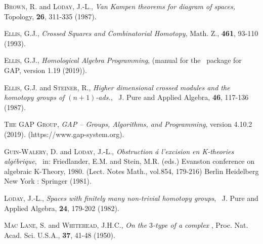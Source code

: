 \documentclass[a4paper,11pt]{article}
\theoremstyle{plain}
\theoremstyle{definition}
\begin{document}
\begin{thebibliography}{99}
	 \textsc{Brown, R.} and \textsc{Loday, J.-L.}, 
	\emph{Van Kampen theorems for diagram of spaces,} 
	Topology, \textbf{26}, 311-335 (1987).
	
	
	
	
	
	 \textsc{Ellis, G.J.}, 
	\emph{Crossed Squares and Combinatorial Homotopy}, 
	Math. Z., \textbf{461}, 93-110 (1993).
	
	 \textsc{Ellis, G.J.}, 
	\emph{Homological Algebra Programming}, 
	{(manual for the \HAP\ package for \textsf{GAP}, version 1.19 (2019))}. 

	 \textsc{Ellis, G.J.} and \textsc{Steiner, R.}, 
	\emph{Higher dimensional crossed modules and the homotopy groups 
	of $(n+1)$-ads.}, \ 
	J. Pure and Applied Algebra, \textbf{46}, 117-136 (1987).
	
	 \textsc{The GAP Group},
	\emph{GAP -- Groups, Algorithms, and Programming}, version 4.10.2 (2019). 
	(https://www.gap-system.org).
	
	 \textsc{Guin-Walery, D.} and \textsc{Loday, J.-L.}, 
	\emph{Obstruction {\'{a}} l'excision en K-theories alg{\'{e}}brique}, \ 
	in: Friedlander, E.M. and Stein, M.R. (eds.) 
	Evanston conference on algebraic K-Theory, 1980.  
	(Lect. Notes Math., vol.854, 179-216) 
	Berlin Heidelberg New York : Springer (1981).
	
	 \textsc{Loday, J.-L.}, 
	\emph{Spaces with finitely many non-trivial homotopy groups}, \ 
	J. Pure and Applied Algebra, \textbf{24}, 179-202 (1982).
	
	\bibitem{maclane-whitehead} 
	\textsc{Mac Lane, S.} and \textsc{Whitehead, J.H.C.}, 
	\emph{On the $3$-type of a complex }, 
	Proc. Nat. Acad. Sci. U.S.A., \textbf{37}, 41-48 (1950).
	

\end{thebibliography}
\end{document}
